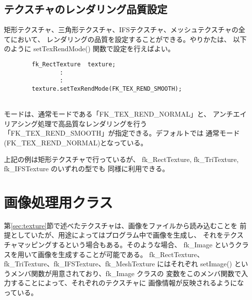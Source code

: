 \subsection{テクスチャのレンダリング品質設定}
矩形テクスチャ、三角形テクスチャ、IFSテクスチャ、メッシュテクスチャの全てにおいて、
レンダリングの品質を設定することができる。やりかたは、
以下のように setTexRendMode() 関数で設定を行えばよい。
\\
\begin{screen}
\begin{verbatim}
        fk_RectTexture  texture;
                :
                :
        texture.setTexRendMode(FK_TEX_REND_SMOOTH);
\end{verbatim}
\end{screen}
~ \\
モードは、通常モードである「FK\_TEX\_REND\_NORMAL」と、
アンチエイリアシング処理で高品質なレンダリングを行う
「FK\_TEX\_REND\_SMOOTH」が指定できる。デフォルトでは
通常モード(FK\_TEX\_REND\_NORMAL)となっている。

上記の例は矩形テクスチャで行っているが、
fk\_RectTexture, fk\_TriTexture, fk\_IFSTexture のいずれの型でも
同様に利用できる。

\section{画像処理用クラス} \label{sec:image}
第\ref{sec:texture}節で述べたテクスチャは、画像をファイルから読み込むことを
前提としていたが、用途によってはプログラム中で画像を生成し、
それをテクスチャマッピングするという場合もある。そのような場合、
fk\_Image というクラスを用いて画像を生成することが可能である。
fk\_RectTexture、fk\_TriTexture、fk\_IFSTexture、fk\_MeshTexture にはそれぞれ
setImage() というメンバ関数が用意されており、fk\_Image クラスの
変数をこのメンバ関数で入力することによって、それぞれのテクスチャに
画像情報が反映されるようになっている。

